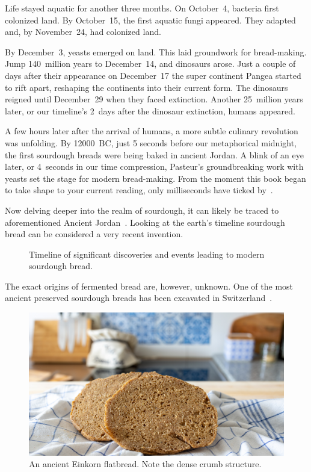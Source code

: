 Life stayed aquatic for another three months.
On October~4, bacteria first colonized land. By October~15, the
first aquatic fungi appeared. They adapted and, by November~24, had colonized
land.

By December~3, yeasts emerged on land. This laid groundwork for bread-making.
Jump 140~million years to December~14, and dinosaurs arose. Just a couple
of days after their appearance on December~17 the super continent Pangea
started to rift apart, reshaping the continents into their current form.
The dinosaurs reigned until December~29 when they faced extinction.
Another 25~million years later, or our timeline's 2~days after the dinosaur
extinction, humans appeared.

A few hours later after the arrival of humans, a more subtle culinary
revolution was unfolding. By \num{12000}~BC, just 5 seconds before our metaphorical
midnight, the first sourdough breads were being baked in ancient Jordan. A blink of
an eye later, or 4~seconds in our time compression, Pasteur's groundbreaking work
with yeasts set the stage for modern bread-making. From the moment this book
began to take shape to your current reading, only milliseconds have ticked
by~\cite{Yong+2017}.

Now delving deeper into the realm of sourdough, it can likely be traced to aforementioned
Ancient Jordan~\cite{jordan+bread}. Looking at the earth's timeline sourdough
bread can be considered a very recent invention.

\begin{figure}[!htb]
  \centering
  
  \caption[Sourdough history timeline]{Timeline of significant discoveries and
  events leading to modern sourdough bread.}%
  \label{fig:sourdough-timeline}
\end{figure}

The exact origins of fermented
bread are, however, unknown. One of the most ancient preserved
sourdough breads has been excavated in Switzerland~\cite{switzerland+bread}.

\begin{figure}[ht]
  \centering
  \includegraphics[width=\textwidth]{einkorn-crumb}
  \caption[Ancient Einkorn flatbread]{An ancient Einkorn flatbread. Note the
      dense crumb structure.}%
  \label{fig:einkorn-crumb}
\end{figure}

